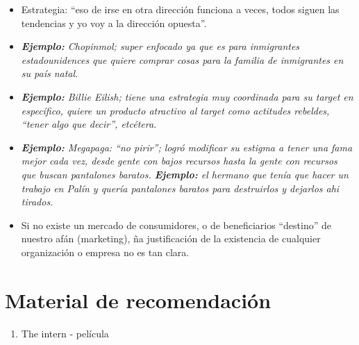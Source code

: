 \begin{itemize}
    \item Estrategia: ``eso de irse en otra dirección funciona a veces, todos siguen las tendencias y yo voy a la dirección opuesta''.
    \item \emph{\textbf{Ejemplo: }Chopinmol; super enfocado ya que es para inmigrantes estadounidences que quiere comprar cosas para la familia de inmigrantes en su país natal.}
    \item \emph{\textbf{Ejemplo: }Billie Eilish; tiene una estrategia muy coordinada para su target en específico, quiere un producto atractivo al target como actitudes rebeldes, ``tener algo que decir'', etcétera.}
    \item \emph{\textbf{Ejemplo: }Megapaga: ``no pirir''; logró modificar su estigma a tener una fama mejor cada vez, desde gente con bajos recursos hasta la gente con recursos que buscan pantalones baratos. \emph{\textbf{Ejemplo: }el hermano que tenía que hacer un trabajo en Palín y quería pantalones baratos para destruirlos y dejarlos ahi tirados.}}
    \item Si no existe un mercado de consumidores, o de beneficiarios ``destino'' de nuestro afán (marketing), ña justificación de la existencia de cualquier organización o empresa no es tan clara.
\end{itemize}

\section{Material de recomendación}
\begin{enumerate}
    \item The intern - película
\end{enumerate}
